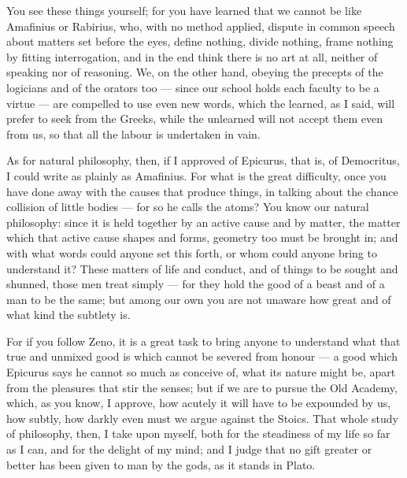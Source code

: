  You see these things yourself; for you have learned that we cannot be like Amafinius or Rabirius, who, with no method applied, dispute in common speech about matters set before the eyes, define nothing, divide nothing, frame nothing by fitting interrogation, and in the end think there is no art at all, neither of speaking nor of reasoning. We, on the other hand, obeying the precepts of the logicians and of the orators too — since our school holds each faculty to be a virtue — are compelled to use even new words, which the learned, as I said, will prefer to seek from the Greeks, while the unlearned will not accept them even from us, so that all the labour is undertaken in vain.

 As for natural philosophy, then, if I approved of Epicurus, that is, of Democritus, I could write as plainly as Amafinius. For what is the great difficulty, once you have done away with the causes that produce things, in talking about the chance collision of little bodies — for so he calls the atoms? You know our natural philosophy: since it is held together by an active cause and by matter, the matter which that active cause shapes and forms, geometry too must be brought in; and with what words could anyone set this forth, or whom could anyone bring to understand it? These matters of life and conduct, and of things to be sought and shunned, those men treat simply — for they hold the good of a beast and of a man to be the same; but among our own you are not unaware how great and of what kind the subtlety is.

 For if you follow Zeno, it is a great task to bring anyone to understand what that true and unmixed good is which cannot be severed from honour — a good which Epicurus says he cannot so much as conceive of, what its nature might be, apart from the pleasures that stir the senses; but if we are to pursue the Old Academy, which, as you know, I approve, how acutely it will have to be expounded by us, how subtly, how darkly even must we argue against the Stoics. That whole study of philosophy, then, I take upon myself, both for the steadiness of my life so far as I can, and for the delight of my mind; and I judge that no gift greater or better has been given to man by the gods, as it stands in Plato.

